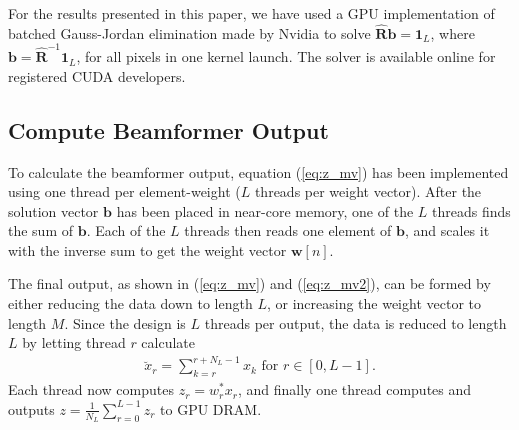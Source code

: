 \documentclass[journal]{IEEEtran}
\newcommand{\mat}[1]{\mathbf{#1}}
\renewcommand{\vec}[1]{\mathbf{#1}}
\begin{document}
For the results presented in this paper, we have used a GPU implementation of batched Gauss-Jordan elimination made by Nvidia to solve $\mat{\hat{R}}\vec{b} = \vec{1}_L$, where $\vec{b} = \mat{\hat{R}}^{-1}\vec{1}_L$, for all pixels in one kernel launch. The solver is available online for registered CUDA developers.%





\subsection{Compute Beamformer Output}
To calculate the beamformer output, equation (\ref{eq:z_mv}) has been implemented using one thread per element-weight ($L$ threads per weight vector). After the solution vector $\vec{b}$ has been placed in near-core memory, one of the $L$ threads finds the sum of $\vec{b}$. 
Each of the $L$ threads then reads one element of $\vec{b}$, and scales it with the inverse sum to get the weight vector $\vec{w}[n]$. 

The final output, as shown in (\ref{eq:z_mv}) and (\ref{eq:z_mv2}), can be formed by either reducing the data down to length $L$, or increasing the weight vector to length $M$. Since the design is $L$ threads per output, the data is reduced to length $L$ by letting thread $r$ calculate 
\begin{align}\label{eq:subsum}
\breve{x}_{r} = \sum_{k=r}^{r+N_L-1}x_{k} \text{ for } r \in [0, L-1].
\end{align}
Each thread now computes $z_r = w_r^*x_r$, and finally one thread computes and outputs $z = \frac{1}{N_L}\sum_{r=0}^{L-1} z_r$ to  GPU DRAM. %
\end{document}
